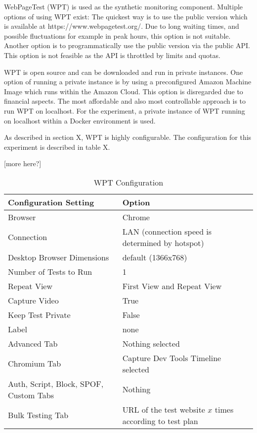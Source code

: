 

WebPageTest (WPT) is used as the synthetic monitoring component.
Multiple options of using WPT exist:
The quickest way is to use the public version which is available at https://www.webpagetest.org/.
Due to long waiting times, and possible fluctuations for example in peak hours, this option is not suitable.
Another option is to programmatically use the public version via the public API.
This option is not feasible as the API is throttled by limits and quotas.

WPT is open source and can be downloaded and run in private instances.
One option of running a private instance is by using a preconfigured Amazon Machine Image which runs within the Amazon Cloud.
This option is disregarded due to financial aspects.
The most affordable and also most controllable approach is to run WPT on localhost.
For the experiment, a private instance of WPT running on localhost within a Docker environment is used.


As described in section X, WPT is highly configurable.
The configuration for this experiment is described in table X.

[more here?]

\begin{table}[h]
	\small
	\centering
	\begin{tabular}{  | l | l | } 
	\hline
	\cellcolor{lightgrey} Configuration Setting & \cellcolor{lightgrey} Option \\
	\hline
	Browser & Chrome \\
	Connection & LAN (connection speed is determined by hotspot) \\
	Desktop Browser Dimensions & default (1366x768) \\
	Number of Tests to Run & 1 \\
	Repeat View & First View and Repeat View \\
	Capture Video & True \\
	Keep Test Private & False \\
	Label & none \\
	\hline	  
	Advanced Tab & Nothing selected \\
	Chromium Tab & Capture Dev Tools Timeline selected  \\
	Auth, Script, Block, SPOF, Custom Tabs & Nothing  \\
	Bulk Testing Tab & URL of the test website $x$ times according to test plan \\
	\hline
	\end{tabular}
	\medskip
	\caption{WPT Configuration}
	\label{table:wpt_configuration}
\end{table}


